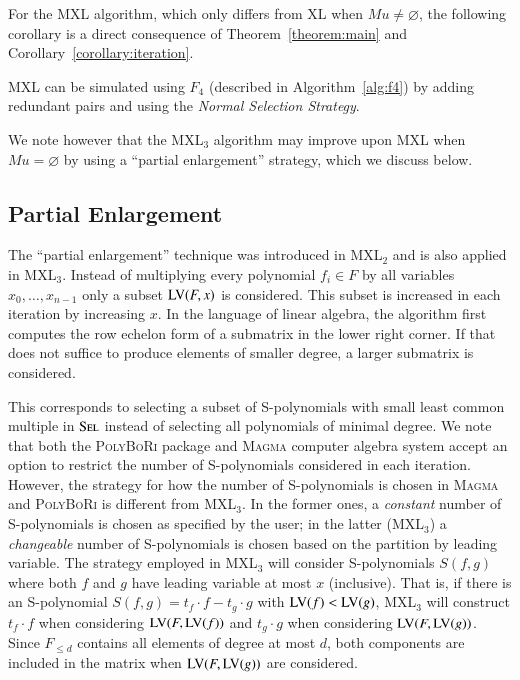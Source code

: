 For the MXL algorithm, which only differs from XL when $Mu \neq\varnothing$, the following corollary is a direct consequence of Theorem~\ref{theorem:main} and Corollary~\ref{corollary:iteration}.

\begin{corollary}
MXL can be simulated using  $F_4$  (described in Algorithm~\ref{alg:f4}) by adding redundant pairs and using the \emph{Normal Selection Strategy}.
\end{corollary}

We note however that the MXL$_3$ algorithm may improve upon MXL when $Mu = \varnothing$ by using a ``partial enlargement'' strategy, which we discuss below.

\subsection{Partial Enlargement}
\label{sec:partion}
The ``partial enlargement'' technique was introduced in MXL$_2$ and is also applied in MXL$_3$. Instead of multiplying every polynomial $f_i \in F$ by all variables $x_0,\ldots,x_{n-1}$ only a subset $\textsc{LV}(F,x)$ is considered. This subset is increased in each iteration by increasing $x$. In the language of linear algebra, the algorithm first computes the row echelon form of a submatrix in the lower right corner. If that does not suffice to produce elements of smaller degree, a larger submatrix is considered.

This corresponds to selecting a subset of S-polynomials with small least common multiple in $\textsc{Sel}$ instead of selecting all polynomials of minimal degree. We note that both the \textsc{PolyBoRi} package \cite{polybori} and \textsc{Magma} computer algebra system \cite{magma} accept an option to restrict the number of S-polynomials considered in each iteration. However, the strategy for how the number of S-polynomials is chosen in \textsc{Magma} and \textsc{PolyBoRi} is different from MXL$_3$. In the former ones, a \emph{constant} number of S-polynomials is chosen as specified by the user; in the latter (MXL$_3$) a 
\emph{changeable} number of S-polynomials is chosen based on the partition by leading variable. The strategy employed in MXL$_3$ will consider S-polynomials $S(f,g)$ where both $f$ and $g$ have leading variable at most $x$ (inclusive). That is, if there is an S-polynomial $S(f,g) = t_f\cdot f - t_g\cdot  g$ with $\textsc{LV}(f) < \textsc{LV}(g)$, MXL$_3$ will construct $t_f \cdot f$ when considering $\textsc{LV}(F,\textsc{LV}(f))$ and $t_g \cdot g$ when considering $\textsc{LV}(F, \textsc{LV}(g))$. Since $F_{\leq d}$ contains all elements of degree at most $d$, both components are included in the matrix when $\textsc{LV}(F,\textsc{LV}(g))$ are considered. 

